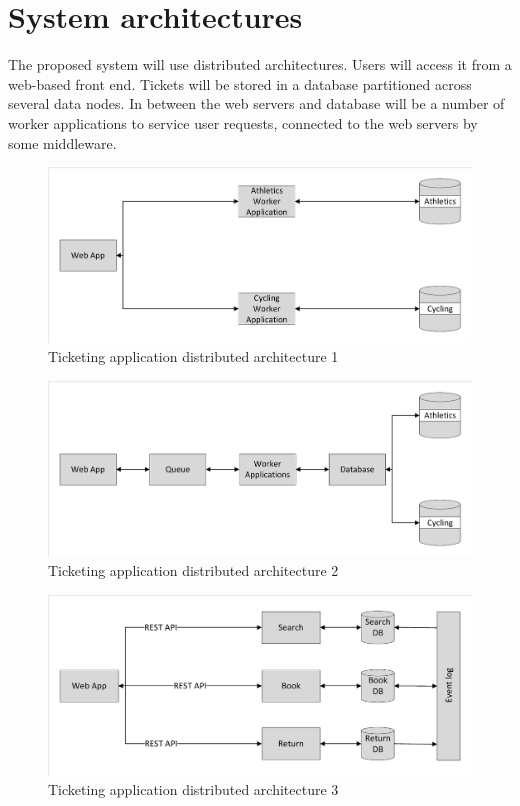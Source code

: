 %
%

\section{System architectures}

The proposed system will use distributed architectures.  Users will access it from a web-based front end.  Tickets will be stored in a database partitioned across several data nodes.  In between the web servers and database will be a number of worker applications to service user requests, connected to the web servers by some middleware.

\begin{figure}
	\caption{Ticketing application distributed architecture 1}
	\centering
	\includegraphics[trim = 5 5 5 5, clip, width=\textwidth]{img/simplemicro}
\end{figure}

\begin{figure}
	\caption{Ticketing application distributed architecture 2}
	\centering
	\includegraphics[trim = 5 5 5 5, clip, width=\textwidth]{img/sharedqueue}
\end{figure}

\begin{figure}
	\caption{Ticketing application distributed architecture 3}
	\centering
	\includegraphics[trim = 5 5 5 5, clip, width=\textwidth]{img/operationmicro}
\end{figure}

